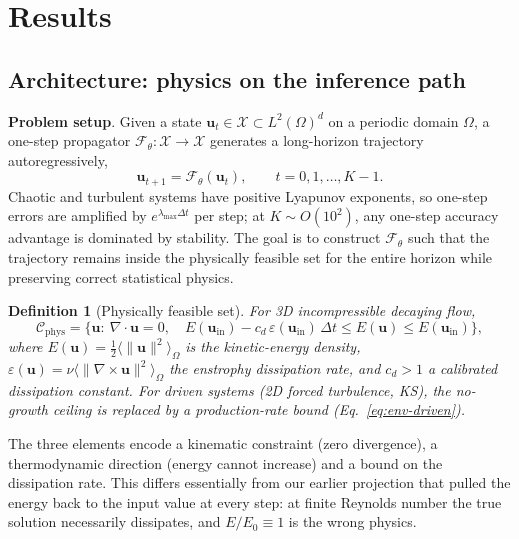 \documentclass[11pt,a4paper]{article}
\newtheorem{definition}{Definition}
\newcommand{\bu}{\bm{u}}
\newcommand{\cF}{\mathcal{F}}
\newcommand{\cC}{\mathcal{C}}
\newcommand{\cX}{\mathcal{X}}
\newcommand{\Ex}{E}
\begin{document}
\section{Results}

\subsection{Architecture: physics on the inference path}\label{sec:arch}

\textbf{Problem setup}. Given a state $\bu_t\in\cX\subset L^2(\Omega)^d$ on a periodic domain $\Omega$, a one-step propagator $\cF_\theta:\cX\to\cX$ generates a long-horizon trajectory autoregressively,
\begin{equation}
\bu_{t+1}=\cF_\theta(\bu_t),\qquad t=0,1,\dots,K-1 .
\label{eq:rollout}
\end{equation}
Chaotic and turbulent systems have positive Lyapunov exponents, so one-step errors are amplified by $e^{\lambda_{\max}\Delta t}$ per step; at $K\sim O(10^2)$, any one-step accuracy advantage is dominated by stability. The goal is to construct $\cF_\theta$ such that the trajectory remains inside the physically feasible set for the entire horizon while preserving correct statistical physics.

\begin{definition}[Physically feasible set]
For 3D incompressible decaying flow,
\begin{equation}
\cC_{\mathrm{phys}}=\Big\{\bu:\ \nabla\!\cdot\!\bu=0,\quad \Ex(\bu_{\mathrm{in}})-c_d\,\varepsilon(\bu_{\mathrm{in}})\,\Delta t\le \Ex(\bu)\le \Ex(\bu_{\mathrm{in}})\Big\},
\label{eq:feasible}
\end{equation}
where $\Ex(\bu)=\tfrac12\langle\|\bu\|^2\rangle_\Omega$ is the kinetic-energy density, $\varepsilon(\bu)=\nu\langle\|\nabla\times\bu\|^2\rangle_\Omega$ the enstrophy dissipation rate, and $c_d>1$ a calibrated dissipation constant. For driven systems (2D forced turbulence, KS), the no-growth ceiling is replaced by a production-rate bound (Eq.~\eqref{eq:env-driven}).
\end{definition}

The three elements encode a kinematic constraint (zero divergence), a thermodynamic direction (energy cannot increase) and a bound on the dissipation rate. This differs essentially from our earlier projection that pulled the energy back to the input value at every step: at finite Reynolds number the true solution necessarily dissipates, and $\Ex/\Ex_0\equiv1$ is the wrong physics.
\end{document}
